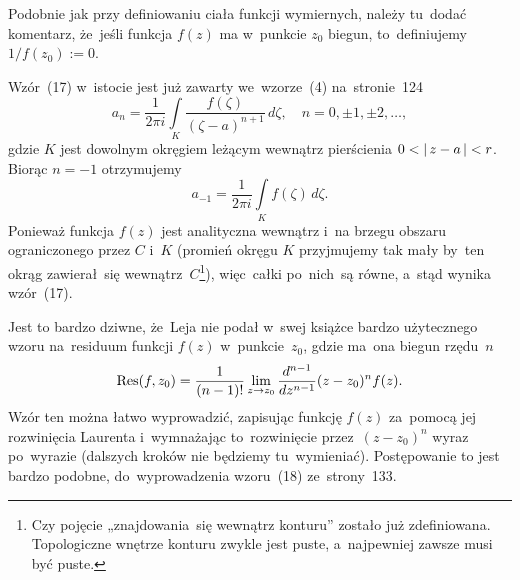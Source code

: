 \documentclass[a4paper,11pt]{article}
\begin{document}
\vspace{\spaceFour}



\start {} Podobnie jak przy definiowaniu ciała funkcji
wymiernych, należy tu~dodać komentarz, że~jeśli funkcja $f( z )$ ma
w~punkcie $z_{ 0 }$ biegun, to~definiujemy $1 / f( z_{ 0 } ) := 0$.

\vspace{\spaceFour}



\start {} Wzór~(17) w~istocie jest już zawarty we~wzorze~(4)
na~stronie~124
\begin{equation}
  \label{eq:Leja-46}
  a_{ n } =
  \frac{ 1 }{ 2\pi i }
  \int\limits_{ K } \frac{ f( \zeta ) }{ ( \zeta - a )^{ n + 1 } } \, d\zeta,
  \quad n = 0, \pm 1, \pm 2, \ldots,
\end{equation}
gdzie $K$ jest dowolnym okręgiem leżącym wewnątrz pierścienia
$0 < |\, {  z - a  } \,| < r$. Biorąc $n = -1$ otrzymujemy
\begin{equation}
  \label{eq:Leja-47}
  a_{ -1 } = \frac{ 1 }{ 2\pi i } \int\limits_{ K } f( \zeta ) \, d\zeta.
\end{equation}
Ponieważ funkcja $f( z )$ jest analityczna wewnątrz i~na brzegu
obszaru ograniczonego przez $C$ i~$K$ (promień okręgu $K$ przyjmujemy
tak mały by~ten okrąg zawierał~się wewnątrz~$C$\footnote{Czy pojęcie
  „znajdowania~się wewnątrz konturu” zostało już zdefiniowana.
  Topologiczne wnętrze konturu zwykle jest puste, a~najpewniej zawsze
  musi być puste.}), więc~całki po~nich~są równe, a~stąd wynika
wzór~(17).

\vspace{\spaceFour}



\start {} Jest to bardzo dziwne, że~Leja nie podał w~swej
książce bardzo użytecznego wzoru na~residuum funkcji $f( z )$
w~punkcie~$z_{ 0 }$, gdzie ma~ona biegun rzędu~$n$
\begin{equation}
  \label{eq:Leja-48}
  \textrm{Res}( f, z_{ 0 } ) =
  \frac{ 1 }{ ( n - 1 )! }
  \lim\limits_{ z \to z_{ 0 } }
  \frac{ d^{ n - 1 } }{ dz^{ n - 1 } } ( z - z_{ 0 } )^{ n } f( z ).
\end{equation}
Wzór ten można łatwo wyprowadzić, zapisując funkcję $f( z )$ za~pomocą
jej rozwinięcia Laurenta i~wymnażając to~rozwinięcie
przez~$( z - z_{ 0 } )^{ n }$ wyraz po~wyrazie (dalszych kroków nie
będziemy tu~wymieniać). Postępowanie to jest bardzo podobne,
do~wyprowadzenia wzoru~(18) ze~strony~133.
\end{document}
